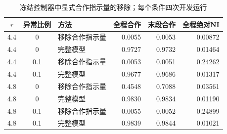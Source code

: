 \begin{table}[!htbp]
\centering\small
\caption{冻结控制器中显式合作指示量的移除；每个条件四次开发运行}
\label{tab:w2-action-feature}
\begin{tabular}{cclrrr}
\toprule
$r$ & 异常比例 & 方法 & 全程合作 & 末段合作 & 全程绝对NI \\
\midrule
4.4 & 0 & 移除合作指示量 & 0.0055 & 0.0053 & 0.00872 \\
4.4 & 0 & 完整模型 & 0.9727 & 0.9732 & 0.01464 \\
4.4 & 0.1 & 移除合作指示量 & 0.0053 & 0.0051 & 0.24262 \\
4.4 & 0.1 & 完整模型 & 0.9677 & 0.9686 & 0.01317 \\
4.8 & 0 & 移除合作指示量 & 0.4548 & 0.7088 & 0.03561 \\
4.8 & 0 & 完整模型 & 0.9830 & 0.9834 & 0.01190 \\
4.8 & 0.1 & 移除合作指示量 & 0.0055 & 0.0052 & 0.24899 \\
4.8 & 0.1 & 完整模型 & 0.9839 & 0.9844 & 0.01021 \\
\bottomrule
\end{tabular}
\par{}
\end{table}
